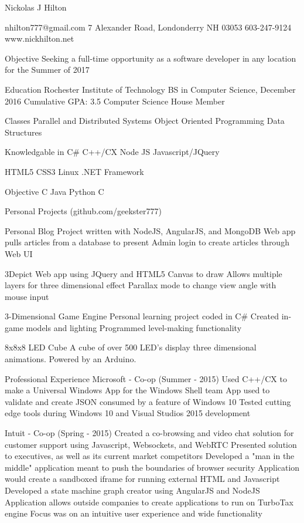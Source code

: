 \documentclass{article}
\begin{document}
Nickolas J Hilton

nhilton777@gmail.com 
7 Alexander Road, Londonderry NH 03053 
603-247-9124 
www.nickhilton.net

Objective
Seeking a full-time opportunity as a software developer in any location for the 
Summer of 2017

Education 
Rochester Institute of Technology
BS in Computer Science, December 2016
Cumulative GPA: 3.5
Computer Science House Member

Classes
Parallel and Distributed Systems    
Object Oriented Programming
Data Structures

Knowledgable in
C\#
C++/CX
Node JS
Javascript/JQuery

HTML5
CSS3
Linux
.NET Framework

Objective C
Java
Python
C

Personal Projects (github.com/geekster777) 

Personal Blog 
Project written with NodeJS, AngularJS, and MongoDB
Web app pulls articles from a database to present
Admin login to create articles through Web UI

3Depict 
Web app using JQuery and HTML5 Canvas to draw
Allows multiple layers for three dimensional effect
Parallax mode to change view angle with mouse input

3-Dimensional Game Engine
Personal learning project coded in C\#
Created in-game models and lighting         
Programmed level-making functionality

8x8x8 LED Cube 
A cube of over 500 LED's
display three dimensional animations. 
Powered by an Arduino.

Professional Experience
Microsoft - Co-op (Summer - 2015)
Used C++/CX to make a Universal Windows App for the Windows Shell team
App used to validate and create JSON consumed by a feature of Windows 10
Tested cutting edge tools during Windows 10 and Visual Studios 2015 development

Intuit - Co-op (Spring - 2015)
Created a co-browsing and video chat solution for customer support using Javascript, Websockets, and WebRTC
Presented solution to executives, as well as its current market competitors 
Developed a "man in the middle" application meant to push the boundaries of browser security
Application would create a sandboxed iframe for running external HTML and Javascript
Developed a state machine graph creator using AngularJS and NodeJS
Application allows outside companies to create applications to run on TurboTax engine
Focus was on an intuitive user experience and wide functionality
\end{document}
